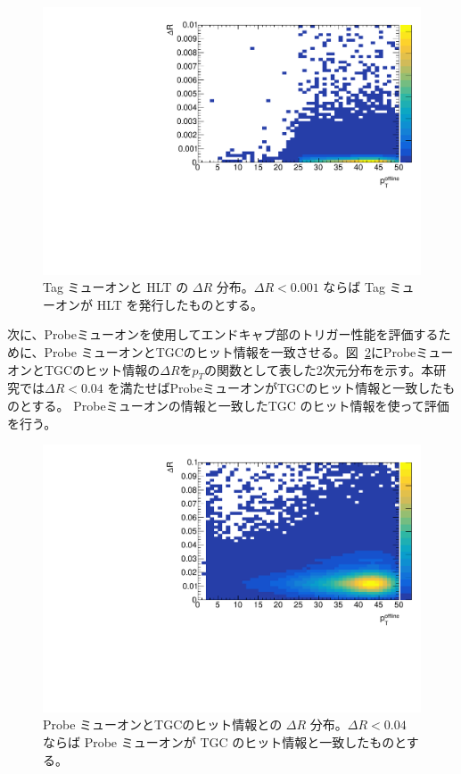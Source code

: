 \begin{figure}[htb]
  \centering
  \includegraphics[clip, width=12cm]{fig/3/dR_tag_HLT.pdf}
  \caption{Tag ミューオンと HLT の $\Delta R$ 分布。$\Delta R < 0.001$ ならば Tag ミューオンが HLT を発行したものとする。}
  \label{fig:tag_HLT}
\end{figure}

次に、Probeミューオンを使用してエンドキャプ部のトリガー性能を評価するために、Probe ミューオンとTGCのヒット情報を一致させる。図~\ref{fig:Probe_TGC}にProbeミューオンとTGCのヒット情報の$\Delta R$を$p_T$の関数として表した2次元分布を示す。本研究では$\Delta R < 0.04$ を満たせばProbeミューオンがTGCのヒット情報と一致したものとする。
Probeミューオンの情報と一致したTGC のヒット情報を使って評価を行う。

\begin{figure}[htb]
  \centering
  \includegraphics[clip, width=12cm]{fig/3/dR_probe_RoI.pdf}
  \caption{Probe ミューオンとTGCのヒット情報との $\Delta R$ 分布。$\Delta R < 0.04$ ならば Probe ミューオンが TGC のヒット情報と一致したものとする。}
  \label{fig:Probe_TGC}
\end{figure}

